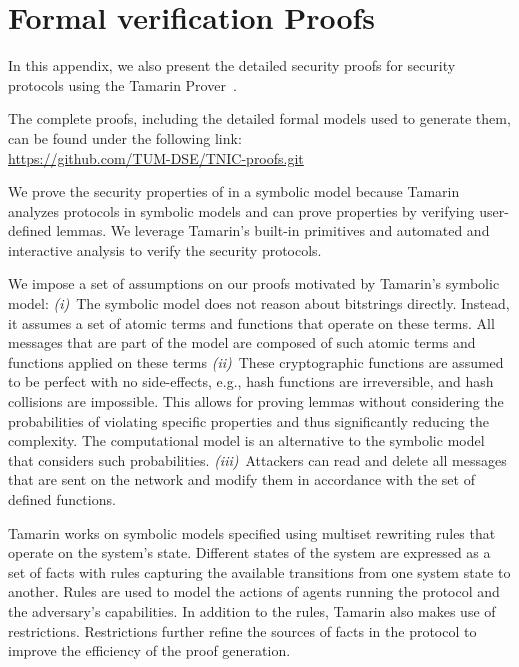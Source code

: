 
\section{Formal verification Proofs}
\label{sec:formal-verification-details}
In this appendix, we also present the detailed security proofs for \projecttitle{} security protocols using
the Tamarin Prover~\cite{tamarin-prover}. 



 The complete proofs, including the detailed formal models used to generate them, can be found under the following link:\\{\color{blue}\url{https://github.com/TUM-DSE/TNIC-proofs.git}}


 We prove the security properties of \projecttitle{}  in a symbolic model because Tamarin analyzes protocols in symbolic models and can prove properties by verifying user-defined lemmas. We leverage Tamarin's built-in primitives and automated and interactive analysis to verify the security protocols.

We impose a set of assumptions on our proofs motivated by Tamarin's symbolic model: \emph{(i)}~The symbolic model does not reason about bitstrings directly. Instead, it assumes a set of atomic terms and functions that operate on these terms. All messages that are part of the model are composed of such atomic terms and functions applied on these terms \emph{(ii)}~These cryptographic functions are assumed to be perfect with no side-effects, e.g., hash functions are irreversible, and hash collisions are impossible. This allows for proving lemmas without considering the probabilities of violating specific properties and thus significantly reducing the complexity. The computational model is an alternative to the symbolic model that considers such probabilities. \emph{(iii)}~Attackers can read and delete all messages that are sent on the network and modify them in accordance with the set of defined functions.

Tamarin works on symbolic models specified using multiset rewriting rules that operate on the system's state. Different states of the system are expressed as a set of facts with rules capturing the available transitions from one system state to another. Rules are used to model the actions of agents running the protocol and the adversary’s capabilities. In addition to the rules, Tamarin also makes use of restrictions. Restrictions further refine the sources of facts in the protocol to improve the efficiency of the proof generation.

